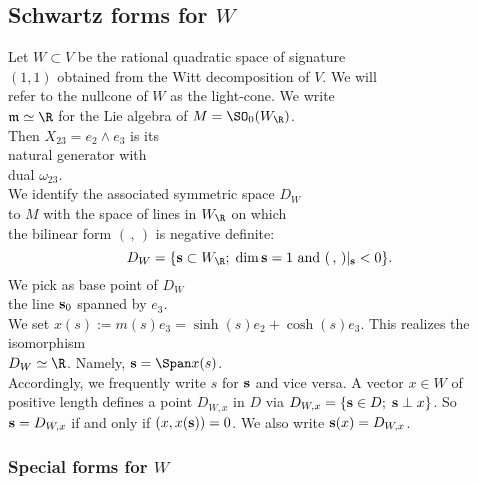 \subsection{Schwartz forms for $W$}


Let $W\subset V$ be the rational quadratic space of signature\\ $(1,1)$ obtained from the Witt decomposition of $V$. We will\\ refer to the nullcone of $W$ as the light-cone. We write\\
$\mathfrak{m} \simeq \R$ for the Lie algebra of $M = \SO_0(W_{\R})$.\\ Then $X_{23} = e_2 \wedge e_3$ is its\\
natural generator with\\dual $\omega_{23}$.\\
We identify the associated symmetric space $D_W$\\
to $M$ with the space of lines in $W_{\R}$ on which\\
the bilinear form $(\,,\,)$ is negative definite: \[D_W = \{{\bf s} \subset W_{\R} ; \;\text{$\dim {\bf s} =1$ and $(\,,\,)|_{\bf s} < 0$} \}. \] We pick as base point of $D_W$\\
the line ${\bf s}_0$ spanned by $e_3$.\\
We set $ x(s) := m(s) e_3 = \sinh(s) e_2 + \cosh(s) e_3$. This realizes the isomorphism\\
$D_W \simeq \R$. Namely, ${\bf s} = \Span x(s)$.\\
Accordingly, we frequently write $s$ for ${\bf s}$ and vice versa.
A vector $x \in W$ of positive length defines a point $D_{W,x}$ in
$D$ via $D_{W,x} = \{ {\bf s} \in D; \; {\bf s} \perp x \}$. So
${\bf s} = D_{W,x}$ if and only if $(x,x({\bf s})) =0$. We also
write ${\bf s}(x)=D_{W,x}$.
\subsubsection{Special forms for $W$}\label{W-forms}

